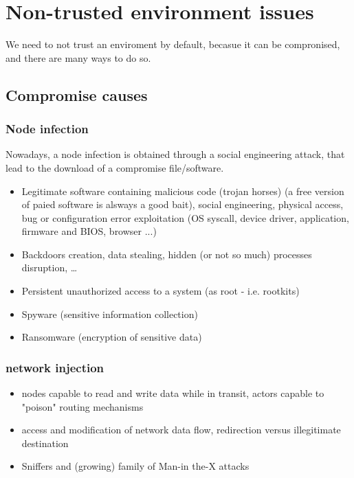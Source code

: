 \chapter{Non-trusted environment issues}
We need to not trust an enviroment by default, becasue it can be compronised, and there are many ways to do so.

\section{Compromise causes}
\subsection{Node infection}
Nowadays, a node infection is obtained through a social engineering attack, that lead to the download of a compromise file/software.
\begin{itemize}[itemsep=0pt]
  \item Legitimate software containing malicious code (trojan horses) (a free version of paied software is alsways a good bait), social engineering, physical access, bug or configuration error exploitation (OS syscall, device driver, application, firmware and BIOS, browser ...)
  \item Backdoors creation, data stealing, hidden (or not so much) processes disruption, …
  \item Persistent unauthorized access to a system (as root - i.e. rootkits)
  \item Spyware (sensitive information collection)
  \item Ransomware (encryption of sensitive data)
\end{itemize}

\subsection{network injection}
\begin{itemize}[itemsep=0pt, topsep=0pt]
  \item nodes capable to read and write data while in transit, actors capable to "poison" routing mechanisms
  \item access and modification of network data flow, redirection versus illegitimate destination
  \item Sniffers and (growing) family of Man-in the-X  attacks
\end{itemize}

